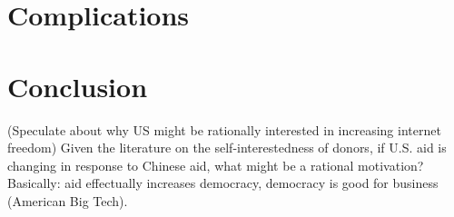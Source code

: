 \documentclass{article}
\begin{document}
\section*{Complications}
 

\section*{Conclusion}
(Speculate about why US might be rationally interested in increasing internet freedom) Given the literature on the self-interestedness of donors, if U.S. aid is changing in response to Chinese aid, what might be a rational motivation? Basically: aid effectually increases democracy, democracy is good for business (American Big Tech).

\pagebreak
\printbibliography
\end{document}
